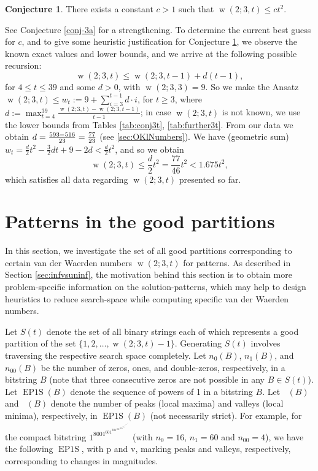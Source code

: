 \documentclass[final,3p,times]{elsarticle}
\theoremstyle{definition}
\newtheorem{conj}{Conjecture}[section]
\newcommand{\set}[1]{\{#1\}}
\renewcommand{\leq}{\le} %
\DeclareMathOperator{\epos}{EP1S}
\DeclareMathOperator{\np}{\mathit{n}_p}
\DeclareMathOperator{\nv}{\mathit{n}_v}
\DeclareMathOperator{\vdw}{w}
\begin{document}
\begin{conj}\label{conj-1}
There exists a constant $c>1$ such that $\vdw(2; 3, t) \leq ct^2$.
\end{conj}

See Conjecture \ref{conj-3a} for a strengthening. To determine the current best guess for $c$, and to give some heuristic justification for Conjecture \ref{conj-1}, we observe the known exact values and lower bounds, and we arrive at the following possible recursion:
\begin{displaymath}
  \vdw(2; 3, t) \leq \vdw(2; 3, t-1)+d(t-1),
\end{displaymath}
for $4 \leq t \leq 39$ and some $d > 0$, with $\vdw(2;3,3)=9$. So we make the Ansatz $\vdw(2;3,t) \leq w_t := 9 + \sum_{i=3}^{t-1} d \cdot i$, for $t \geq 3$, where $d := \max_{t=4}^{39} \frac{\vdw(2;3,t) - \vdw(2;3,t-1)}{t-1}$; in case $\vdw(2;3,t)$ is not known, we use the lower bounds from Tables \ref{tab:conj3t}, \ref{tab:further3t}. From our data we obtain $d = {593-516 \over 23} = \frac{77}{23}$ (see \ref{sec:OKlNumbers}).
We have (geometric sum) $w_t = \frac d2 t^2 - \frac 32 d t + 9 - 2d < \frac d2 t^2$, and so we obtain
\begin{displaymath}
  \vdw(2;3,t) \leq \frac d2 t^2 = \frac{77}{46} t^2 < 1.675 t^2,
\end{displaymath}
which satisfies all data regarding $\vdw(2; 3,t)$ presented so far.




\section{Patterns in the good partitions}
\label{sec-pat}

In this section, we investigate the set of all good partitions
corresponding to certain van der Waerden numbers $\vdw(2; 3, t)$ for
patterns. As described in Section \ref{sec:infvsuninf}, the motivation behind this section
is to obtain more problem-specific information on the solution-patterns, which may help to
design heuristics to reduce search-space
while computing specific van der Waerden numbers.

Let $S(t)$ denote the set of all binary strings each of which represents a good partition of the set
$\set{1,2,\ldots,\vdw(2; 3, t)-1}$.
Generating $S(t)$ involves traversing the respective search space completely.
Let $n_0(B)$, $n_1(B)$, and $n_{00}(B)$ be the number of zeros, ones, and double-zeros, respectively,
in a bitstring $B$ (note that three consecutive zeros are not possible in any $B \in S(t)$). Let $\epos(B)$ denote the sequence of powers of 1 in a bitstring $B$.
Let $\np(B)$ and $\nv(B)$ denote the number of peaks (local maxima) and valleys (local minima), respectively, in
$\epos(B)$ (not necessarily strict). For example, for the compact bitstring $1^8001^601^301^101^3001^501^801^5001^301^101^301^6001^8$ (with $n_0 = 16$, $n_1 = 60$ and $n_{00} = 4$),
we have the following $\epos$, with \textrm{p} and \textrm{v}, marking peaks and valleys, respectively,
corresponding to changes in magnitudes.
\end{document}
